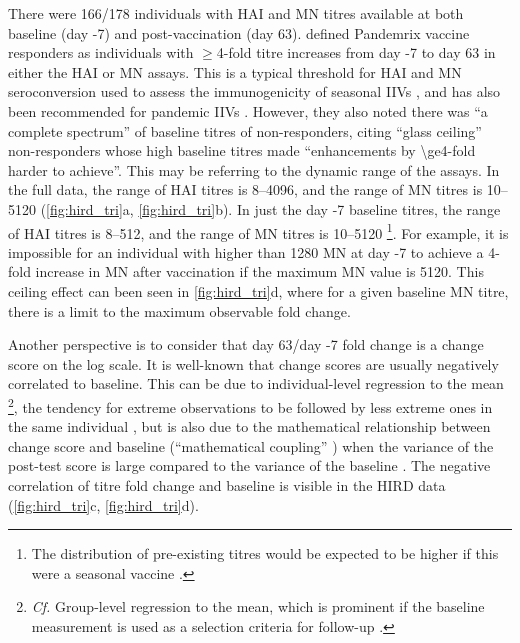 

There were 166/178 individuals with \gls{HAI} and \gls{MN} titres available at both baseline (day -7) and post-vaccination (day 63).
\textcite{sobolev2016AdjuvantedInfluenzaH1N1Vaccination} defined Pandemrix vaccine responders as individuals with $\ge$4-fold titre increases from day -7 to day 63 in either the \gls{HAI} or \gls{MN} assays.
This is a typical threshold for \gls{HAI} and \gls{MN} seroconversion used to assess the immunogenicity of seasonal \glspl{IIV} \autocite{krammer2019HumanAntibodyResponse}, 
and has also been recommended for pandemic \glspl{IIV} \autocite{foodanddrugadministration2007GuidanceIndustryClinical}.
However, they also noted there was \enquote{a complete spectrum} of baseline titres of non-responders, citing \enquote{glass ceiling} non-responders whose high baseline titres made \enquote{enhancements by \num{\ge4}-fold harder to achieve}.
This may be referring to the dynamic range of the assays.
In the full data, the range of \gls{HAI} titres is \numrange{8}{4096}, and the range of \gls{MN} titres is \numrange{10}{5120} (\cref{fig:hird_tri}a, \cref{fig:hird_tri}b).
In just the day -7 baseline titres, the range of \gls{HAI} titres is \numrange{8}{512}, and the range of \gls{MN} titres is \numrange{10}{5120}%
\footnote{
    The distribution of pre-existing titres would be expected to be higher if this were a seasonal vaccine \autocite{tsang2014GlobalAnalysesHuman}.
}.
For example, it is impossible for an individual with higher than 1280 \gls{MN} at day -7 to achieve a 4-fold increase in \gls{MN} after vaccination if the maximum \gls{MN} value is \num{5120}.
This ceiling effect can been seen in \cref{fig:hird_tri}d, where for a given baseline \gls{MN} titre, there is a limit to the maximum observable fold change.

Another perspective is to consider that day 63/day -7 fold change is a change score on the log scale.
It is well-known that change scores are usually negatively correlated to baseline.
This can be due to individual-level regression to the mean%
\footnote{
    \textit{Cf.} Group-level regression to the mean, which is prominent if the baseline measurement is used as a selection criteria for follow-up \autocite{barnett2004RegressionMeanWhat,senn2011FrancisGaltonRegression}.
}, 
the tendency for extreme observations to be followed by less extreme ones in the same individual \autocite{barnett2004RegressionMeanWhat},
but is also due to the mathematical relationship between change score and baseline (\enquote{mathematical coupling} \autocite{tu2007RevisitingRelationChange}) when the variance of the post-test score is large compared to the variance of the baseline \autocite{clifton2019CorrelationBaselineScore}.
The negative correlation of titre fold change and baseline is visible in the \gls{HIRD} data (\cref{fig:hird_tri}c, \cref{fig:hird_tri}d).


